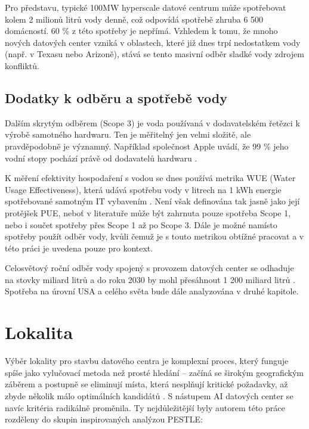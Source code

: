 Pro představu, typické 100MW hyperscale datové centrum může spotřebovat kolem 2 milionů litrů vody denně, což odpovídá spotřebě zhruba 6 500 domácností. 60 \% z této spotřeby je nepřímá. \cite{li_making_2025} Vzhledem k tomu, že mnoho nových datových center vzniká v oblastech, které již dnes trpí nedostatkem vody (např. v Texasu nebo Arizoně), stává se tento masivní odběr sladké vody zdrojem konfliktů.

\subsection{Dodatky k odběru a spotřebě vody}
\label{subsec:dodatky_voda}

Dalším skrytým odběrem (Scope 3) je voda používaná v dodavatelském řetězci k výrobě samotného hardwaru. Ten je měřitelný jen velmi složitě, ale pravděpodobně je významný. Například společnost Apple uvádí, že 99 \% jeho vodní stopy pochází právě od dodavatelů hardwaru \cite{li_making_2025}.

K měření efektivity hospodaření s vodou se dnes používá metrika WUE (Water Usage Effectiveness), která udává spotřebu vody v litrech na 1 kWh energie spotřebované samotným IT vybavením \cite{jegham_how_2025}. Není však definována tak jasně jako její protějšek PUE, neboť v literatuře může být zahrnuta pouze spotřeba Scope 1, nebo i součet spotřeby přes Scope 1 až po Scope 3. Dále je možné namísto spotřeby použít odběr vody, kvůli čemuž je s touto metrikou obtížné pracovat a v této práci je uvedena pouze pro kontext. 

Celosvětový roční odběr vody spojený s provozem datových center se odhaduje na stovky miliard litrů a do roku 2030 by mohl přesáhnout 1 200 miliard litrů \cite[s. 242]{iea_energy_2025}. Spotřeba na úrovní USA a celého světa bude dále analyzována v druhé kapitole.

\section{Lokalita}
\label{sec:lokalita}


Výběr lokality pro stavbu datového centra je komplexní proces, který funguje spíše jako vylučovací metoda než prosté hledání – začíná se širokým geografickým záběrem a postupně se eliminují místa, která nesplňují kritické požadavky, až zbyde několik málo optimálních kandidátů \cite{geng_data_2014}. S nástupem AI datových center se navíc kritéria radikálně proměnila. Ty nejdůležitější byly autorem této práce rozděleny do skupin inspirovaných analýzou PESTLE:

